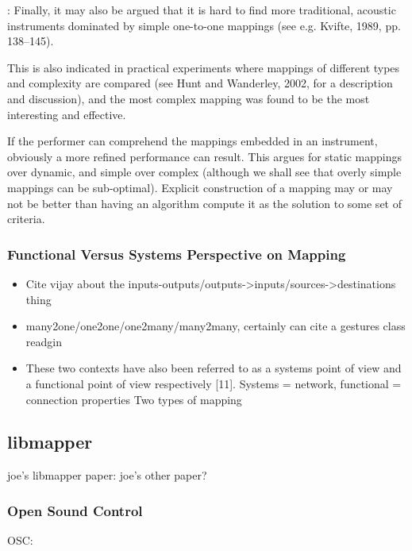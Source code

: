 \cite{describing_mappings} : Finally, it may also be argued that it is hard to find more traditional, acoustic instruments dominated by simple one-to-one mappings (see e.g. Kvifte, 1989, pp. 138–145).

This is also indicated in practical experiments where mappings of different types and complexity are compared (see Hunt and Wanderley, 2002, for a description and discussion), and the most complex mapping was found to be the most interesting and effective.

\cite{interpolated_mappings}
If the performer can comprehend the mappings embedded in an instrument, obviously a more refined performance can result. This argues for static mappings over dynamic, and simple over complex (although we shall see that overly simple mappings can be sub-optimal). Explicit construction of a mapping may or may not be better than having an algorithm compute it as the solution to some set of criteria.

	\subsubsection{Functional Versus Systems Perspective on Mapping}

	\begin{itemize}
		\item Cite vijay about the inputs-outputs/outputs->inputs/sources->destinations thing
		\item many2one/one2one/one2many/many2many, certainly can cite a gestures class readgin 
		\item These two contexts have also been referred to as a systems point of view and a functional point of view respectively [11].  Systems = network, functional = connection properties Two types of mapping \cite{two_types_of_mapping}
	\end{itemize}



\subsection{libmapper}
	joe's libmapper paper: 
	joe's other paper?
	\subsubsection{Open Sound Control}
	OSC: 
